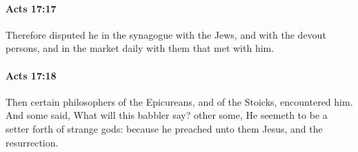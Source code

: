 		\paragraph{Acts 17:17} %
			\label{ACTS-17-17}

			Therefore disputed he in the synagogue with the Jews, and with the devout persons, and in the market daily with them that met with him.

			\begin{framed}
			\scriptsize
				\begin{compactdesc}
					\item[SBLG] 
				\end{compactdesc}
			\end{framed}

		\paragraph{Acts 17:18} %
			\label{ACTS-17-18}

			Then certain philosophers of the Epicureans, and of the Stoicks, encountered him.  And some said, What will this babbler say?  other some, He seemeth to be a setter forth of strange gods: because he preached unto them Jesus, and the resurrection.


